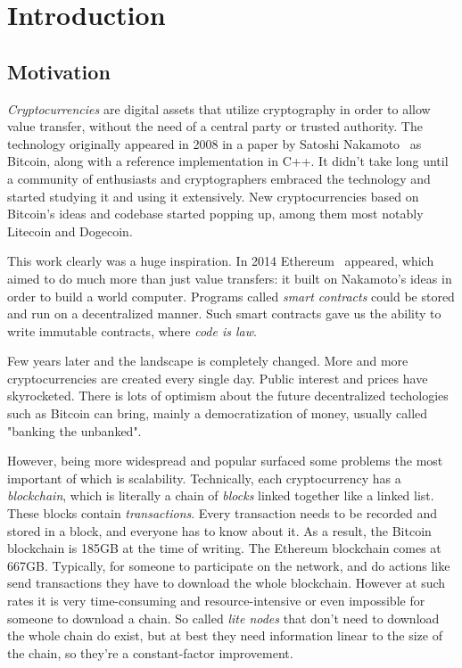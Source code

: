 \chapter{Introduction}

\section{Motivation}
\emph{Cryptocurrencies} are digital assets that utilize cryptography in order to allow value transfer, without the need of a central party or trusted authority. The technology originally appeared in 2008 in a paper by Satoshi Nakamoto~\cite{bitcoin} as Bitcoin, along with a reference implementation in C++. It didn't take long until a community of enthusiasts and cryptographers embraced the technology and started studying it and using it extensively. New cryptocurrencies based on Bitcoin's ideas and codebase started popping up, among them most notably Litecoin and Dogecoin.

This work clearly was a huge inspiration. In 2014 Ethereum~\cite{ethereum} appeared, which aimed to do much more than just value transfers: it built on Nakamoto's ideas in order to build a world computer. Programs called \emph{smart contracts} could be stored and run on a decentralized manner. Such smart contracts gave us the ability to write immutable contracts, where \emph{code is law}.

Few years later and the landscape is completely changed. More and more cryptocurrencies are created every single day. Public interest and prices have skyrocketed. There is lots of optimism about the future decentralized techologies such as Bitcoin can bring, mainly a democratization of money, usually called "banking the unbanked".

However, being more widespread and popular surfaced some problems the most important of which is scalability. Technically, each cryptocurrency has a \emph{blockchain}, which is literally a chain of \emph{blocks} linked together like a linked list. These blocks contain \emph{transactions}. Every transaction needs to be recorded and stored in a block, and everyone has to know about it. As a result, the Bitcoin blockchain is 185GB at the time of writing. The Ethereum blockchain comes at 667GB. Typically, for someone to participate on the network, and do actions like send transactions they have to download the whole blockchain. However at such rates it is very time-consuming and resource-intensive or even impossible for someone to download a chain. So called \emph{lite nodes} that don't need to download the whole chain do exist, but at best they need information linear to the size of the chain, so they're a constant-factor improvement.

